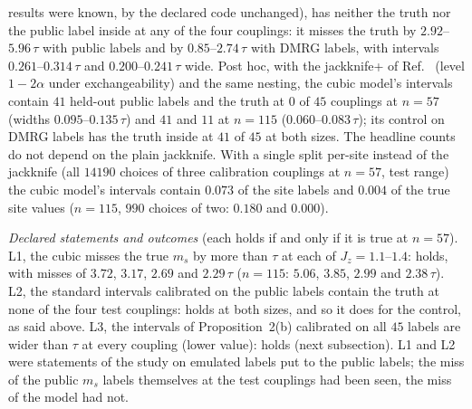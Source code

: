 \documentclass[aps,prx,onecolumn,10pt,nofootinbib,longbibliography,floatfix]{revtex4-2}
\theoremstyle{remark}
\newcommand{\Jz}{J_z}
\newcommand{\ms}{m_s}
\begin{document}
results were known, by the declared code unchanged), has neither the truth nor the public label inside at any of
the four couplings: it misses the truth by $2.92$--$5.96\,\tau$ with public labels and by $0.85$--$2.74\,\tau$ %
with DMRG labels, with intervals $0.261$--$0.314\,\tau$ and $0.200$--$0.241\,\tau$ wide. %
Post hoc, with the jackknife+ of Ref.~\cite{barber2019} (level $1-2\alpha$ under exchangeability) and the same
nesting, the cubic model's intervals contain $41$ held-out public labels and the truth at $0$ of $45$ couplings at %
$n=57$ (widths $0.095$--$0.135\,\tau$) and $41$ and $11$ at $n=115$ ($0.060$--$0.083\,\tau$); its control on DMRG %
labels has the truth inside at $41$ of $45$ at both sizes. The headline counts do not depend on the plain jackknife. %
With a single split per-site instead of the jackknife (all $14190$ choices of three calibration couplings at %
$n=57$, test range) the cubic model's intervals contain $0.073$ of the site labels and $0.004$ of the true site %
values ($n=115$, $990$ choices of two: $0.180$ and $0.000$). %

\emph{Declared statements and outcomes} (each holds if and only if it is true at $n=57$). %
L1, the cubic misses the true $\ms$ by more than $\tau$ at each of $\Jz=1.1$--$1.4$: holds, with misses of $3.72$, %
$3.17$, $2.69$ and $2.29\,\tau$ ($n=115$: $5.06$, $3.85$, $2.99$ and $2.38\,\tau$). L2, the standard intervals %
calibrated on the public labels contain the truth at none of the four test couplings: holds at both sizes, and so
it does for the control, as said above. L3, the intervals of Proposition~2(b) calibrated on all $45$ labels are %
wider than $\tau$ at every coupling (lower value): holds (next subsection). L1 and L2 were statements of the study
on emulated labels put to the public labels; the miss of the public $\ms$ labels themselves at the test couplings
had been seen, the miss of the model had not.
\end{document}
